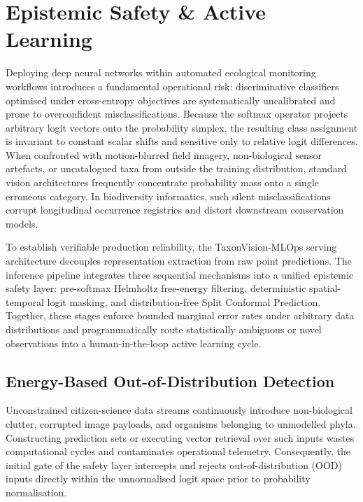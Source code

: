 \chapter{Epistemic Safety \& Active Learning}
\label{ch:safety}

Deploying deep neural networks within automated ecological monitoring workflows introduces a fundamental operational risk: discriminative classifiers optimised under cross-entropy objectives are systematically uncalibrated and prone to overconfident misclassifications. Because the softmax operator projects arbitrary logit vectors onto the probability simplex, the resulting class assignment is invariant to constant scalar shifts and sensitive only to relative logit differences. When confronted with motion-blurred field imagery, non-biological sensor artefacts, or uncatalogued taxa from outside the training distribution, standard vision architectures frequently concentrate probability mass onto a single erroneous category. In biodiversity informatics, such silent misclassifications corrupt longitudinal occurrence registries and distort downstream conservation models.

To establish verifiable production reliability, the TaxonVision-MLOps serving architecture decouples representation extraction from raw point predictions. The inference pipeline integrates three sequential mechanisms into a unified epistemic safety layer: pre-softmax Helmholtz free-energy filtering, deterministic spatial-temporal logit masking, and distribution-free Split Conformal Prediction. Together, these stages enforce bounded marginal error rates under arbitrary data distributions and programmatically route statistically ambiguous or novel observations into a human-in-the-loop active learning cycle.

\section{Energy-Based Out-of-Distribution Detection}
\label{sec:energy_ood}

Unconstrained citizen-science data streams continuously introduce non-biological clutter, corrupted image payloads, and organisms belonging to unmodelled phyla. Constructing prediction sets or executing vector retrieval over such inputs wastes computational cycles and contaminates operational telemetry. Consequently, the initial gate of the safety layer intercepts and rejects out-of-distribution (OOD) inputs directly within the unnormalised logit space prior to probability normalisation.

